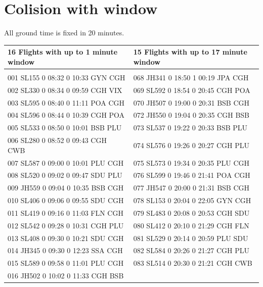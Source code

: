 \documentclass{endm}
\begin{document}
\section{Colision with window}

All ground time is fixed in 20 minutes.

\begin{center}

\renewcommand{\arraystretch}{0.6}

\label {tabela4}
\begin{longtable}{l|l} 

\hline
\scriptsize 16 Flights with up to 1 minute window & \scriptsize 15 Flights with up to 17 minute window\\
\hline
\\

\scriptsize 001 SL155 0 08:32 0 10:33 GYN CGH & \scriptsize 068 JH341 0 18:50 1 00:19 JPA CGH\\
\scriptsize 002 SL330 0 08:34 0 09:59 CGH VIX & \scriptsize 069 SL592 0 18:54 0 20:45 CGH POA \\
\scriptsize 003 SL595 0 08:40 0 11:11 POA CGH & \scriptsize 070 JH507 0 19:00 0 20:31 BSB CGH\\
\scriptsize 004 SL596 0 08:44 0 10:39 CGH POA & \scriptsize 072 JH550 0 19:04 0 20:35 CGH BSB\\
\scriptsize 005 SL533 0 08:50 0 10:01 BSB PLU & \scriptsize 073 SL537 0 19:22 0 20:33 BSB PLU\\
\scriptsize 006 SL280 0 08:52 0 09:43 CGH CWB & \scriptsize 074 SL576 0 19:26 0 20:27 CGH PLU\\
\scriptsize 007 SL587 0 09:00 0 10:01 PLU CGH & \scriptsize 075 SL573 0 19:34 0 20:35 PLU CGH\\
\scriptsize 008 SL520 0 09:02 0 09:47 SDU PLU & \scriptsize 076 SL599 0 19:46 0 21:41 POA CGH\\
\scriptsize 009 JH559 0 09:04 0 10:35 BSB CGH & \scriptsize 077 JH547 0 20:00 0 21:31 BSB CGH\\
\scriptsize 010 SL406 0 09:06 0 09:55 SDU CGH & \scriptsize 078 SL153 0 20:04 0 22:05 GYN CGH\\
\scriptsize 011 SL419 0 09:16 0 11:03 FLN CGH & \scriptsize 079 SL483 0 20:08 0 20:53 CGH SDU\\
\scriptsize 012 SL542 0 09:28 0 10:31 CGH PLU & \scriptsize 080 SL412 0 20:10 0 21:29 CGH FLN\\
\scriptsize 013 SL408 0 09:30 0 10:21 SDU CGH & \scriptsize 081 SL529 0 20:14 0 20:59 PLU SDU\\
\scriptsize 014 JH345 0 09:30 0 12:23 SSA CGH & \scriptsize 082 SL584 0 20:26 0 21:27 CGH PLU\\
\scriptsize 015 SL589 0 09:58 0 11:01 PLU CGH & \scriptsize 083 SL514 0 20:30 0 21:21 CGH CWB\\
\scriptsize 016 JH502 0 10:02 0 11:33 CGH BSB & \\

\end{longtable}

\end{center}
	
\end{document}
